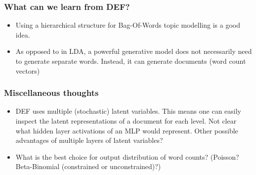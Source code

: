 \documentclass{beamer}
\begin{document}
\begin{frame}
\frametitle{What can we learn from DEF?}
\begin{itemize}
\item{Using a hierarchical structure for Bag-Of-Words topic modelling is a good idea.}
\item{As opposed to in LDA, a powerful generative model does not necessarily need to generate separate words. Instead, it can generate documents (word count vectors)}
\end{itemize}
\end{frame}

\begin{frame}
\frametitle{Miscellaneous thoughts}
\begin{itemize}
\item{DEF uses multiple (stochastic) latent variables. This means one can easily inspect the latent representations of a document for each level. Not clear what hidden layer activations of an MLP would represent. Other possible advantages of multiple layers of latent variables?}
\item{What is the best choice for output distribution of word counts? (Poisson? Beta-Binomial (constrained or unconstrained)?)}
\end{itemize}
\end{frame}
\end{document}
